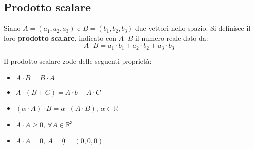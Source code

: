 \documentclass[a4paper,12pt, oneside]{book}
\begin{document}
\subsection{Prodotto scalare}
\begin{definizione}
	Siano $A=(a_1,a_2,a_3)$ e $B=(b_1,b_2,b_3)$ due vettori nello spazio. Si definisce il loro \textbf{prodotto scalare}, indicato con $A\cdot B$ il numero reale dato da:
	$$A\cdot B=a_1\cdot b_1+a_2\cdot b_2+a_3\cdot b_3$$
\end{definizione}
Il prodotto scalare gode delle seguenti proprietà:
\begin{itemize}
	\item $A\cdot B=B\cdot A$
	\item $A\cdot (B+C)=A\cdot b+A\cdot C$
	\item $(	\alpha\cdot A)\cdot B=\alpha\cdot (A\cdot B),\, \alpha\in\mathbb{R}$
	\item $A\cdot A\geq 0,\,\forall A\in\mathbb{R}^3$
	\item $A\cdot A= 0,\,A=\underline{0}=(0,0,0)$

\end{itemize}
\end{document}
